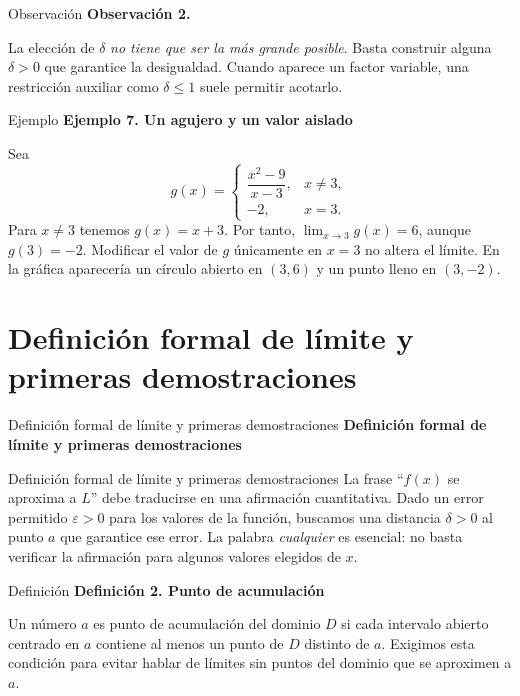 \documentclass[12pt,aspectratio=169]{beamer}
\begin{document}
\begin{frame}[t,allowframebreaks]{Observación}
{\color{azul}\bfseries Observación 2.}\par\medskip

La elección de $\delta$ \emph{no tiene que ser la más grande posible}. Basta construir alguna $\delta>0$ que garantice la desigualdad. Cuando aparece un factor variable, una restricción auxiliar como $\delta\le 1$ suele permitir acotarlo.
\end{frame}


\begin{frame}[t,allowframebreaks]{Ejemplo}
{\color{azul}\bfseries Ejemplo 7. Un agujero y un valor aislado}\par\medskip

Sea
\[
 g(x)=\begin{cases}\dfrac{x^2-9}{x-3},&x\ne3,\\ -2,&x=3.\end{cases}
\]
Para $x\ne3$ tenemos $g(x)=x+3$. Por tanto, $\lim_{x\to3}g(x)=6$, aunque $g(3)=-2$. Modificar el valor de $g$ únicamente en $x=3$ no altera el límite. En la gráfica aparecería un círculo abierto en $(3,6)$ y un punto lleno en $(3,-2)$.
\end{frame}


\section{Definición formal de límite y primeras demostraciones}

\begin{frame}[t]{Definición formal de límite y primeras demostraciones}
\centering\vfill{\Large\bfseries\color{azul} Definición formal de límite y primeras demostraciones}\vfill
\end{frame}


\begin{frame}[t,allowframebreaks]{Definición formal de límite y primeras demostraciones}
La frase ``$f(x)$ se aproxima a $L$'' debe traducirse en una afirmación cuantitativa. Dado un error permitido $\varepsilon>0$ para los valores de la función, buscamos una distancia $\delta>0$ al punto $a$ que garantice ese error. La palabra \emph{cualquier} es esencial: no basta verificar la afirmación para algunos valores elegidos de $x$.
\end{frame}


\begin{frame}[t,allowframebreaks]{Definición}
{\color{azul}\bfseries Definición 2. Punto de acumulación}\par\medskip

Un número $a$ es punto de acumulación del dominio $D$ si cada intervalo abierto centrado en $a$ contiene al menos un punto de $D$ distinto de $a$. Exigimos esta condición para evitar hablar de límites sin puntos del dominio que se aproximen a $a$.
\end{frame}
\end{document}

